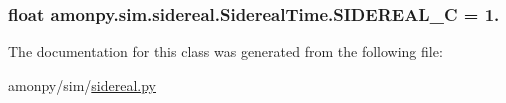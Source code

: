 \hypertarget{classamonpy_1_1sim_1_1sidereal_1_1_sidereal_time_a47b7e4c9abab2c7de7fc3acc43b02de7}{
\subsubsection[{S\-I\-D\-E\-R\-E\-A\-L\-\_\-\-C}]{\setlength{\rightskip}{0pt plus 5cm}float amonpy.\-sim.\-sidereal.\-Sidereal\-Time.\-S\-I\-D\-E\-R\-E\-A\-L\-\_\-\-C = 1.\hspace{0.3cm}{\ttfamily [static]}}}\label{classamonpy_1_1sim_1_1sidereal_1_1_sidereal_time_a47b7e4c9abab2c7de7fc3acc43b02de7}


The documentation for this class was generated from the following file\-:\begin{DoxyCompactItemize}
\item 
amonpy/sim/\hyperlink{sidereal_8py}{sidereal.\-py}\end{DoxyCompactItemize}
